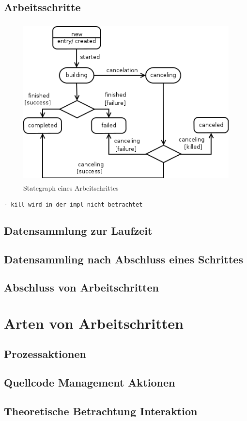 \subsection{Arbeitsschritte}
\begin{figure}[ht] 
  \label{fig:lebenszyklus-arbeitsschritt}
  \begin{center}
      \includegraphics[height=3.4in]{imageinput/lebenszyklus-arbeitsschritt.png}
  \end{center}
  \caption{Stategraph eines Arbeitschrittes}
\end{figure}

\begin{verbatim}
- kill wird in der impl nicht betrachtet
\end{verbatim}


\subsection{Datensammlung zur Laufzeit}
\subsection{Datensammling nach Abschluss eines Schrittes}
\subsection{Abschluss von Arbeitschritten}


\section{Arten von Arbeitschritten}
\subsection{Prozessaktionen}
\subsection{Quellcode Management Aktionen}
\subsection{Theoretische Betrachtung Interaktion}
